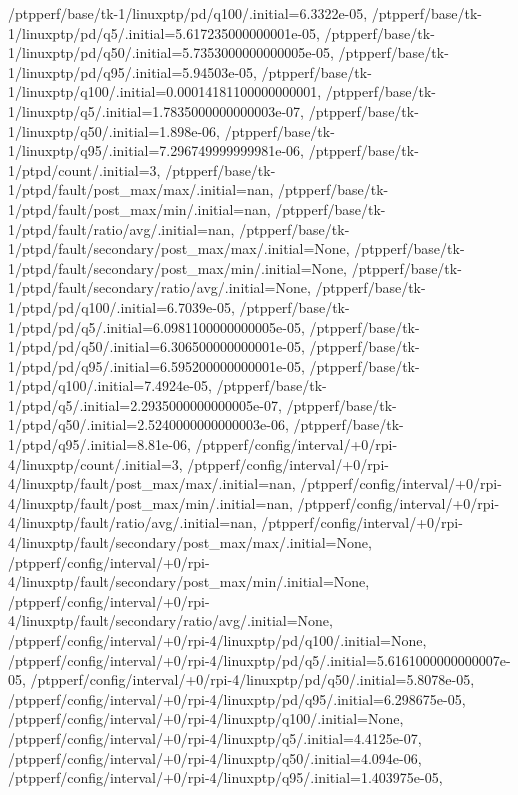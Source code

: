 {    /ptpperf/base/tk-1/linuxptp/pd/q100/.initial=6.3322e-05,
    /ptpperf/base/tk-1/linuxptp/pd/q5/.initial=5.617235000000001e-05,
    /ptpperf/base/tk-1/linuxptp/pd/q50/.initial=5.7353000000000005e-05,
    /ptpperf/base/tk-1/linuxptp/pd/q95/.initial=5.94503e-05,
    /ptpperf/base/tk-1/linuxptp/q100/.initial=0.00014181100000000001,
    /ptpperf/base/tk-1/linuxptp/q5/.initial=1.7835000000000003e-07,
    /ptpperf/base/tk-1/linuxptp/q50/.initial=1.898e-06,
    /ptpperf/base/tk-1/linuxptp/q95/.initial=7.296749999999981e-06,
    /ptpperf/base/tk-1/ptpd/count/.initial=3,
    /ptpperf/base/tk-1/ptpd/fault/post_max/max/.initial=nan,
    /ptpperf/base/tk-1/ptpd/fault/post_max/min/.initial=nan,
    /ptpperf/base/tk-1/ptpd/fault/ratio/avg/.initial=nan,
    /ptpperf/base/tk-1/ptpd/fault/secondary/post_max/max/.initial=None,
    /ptpperf/base/tk-1/ptpd/fault/secondary/post_max/min/.initial=None,
    /ptpperf/base/tk-1/ptpd/fault/secondary/ratio/avg/.initial=None,
    /ptpperf/base/tk-1/ptpd/pd/q100/.initial=6.7039e-05,
    /ptpperf/base/tk-1/ptpd/pd/q5/.initial=6.0981100000000005e-05,
    /ptpperf/base/tk-1/ptpd/pd/q50/.initial=6.306500000000001e-05,
    /ptpperf/base/tk-1/ptpd/pd/q95/.initial=6.595200000000001e-05,
    /ptpperf/base/tk-1/ptpd/q100/.initial=7.4924e-05,
    /ptpperf/base/tk-1/ptpd/q5/.initial=2.2935000000000005e-07,
    /ptpperf/base/tk-1/ptpd/q50/.initial=2.5240000000000003e-06,
    /ptpperf/base/tk-1/ptpd/q95/.initial=8.81e-06,
    /ptpperf/config/interval/+0/rpi-4/linuxptp/count/.initial=3,
    /ptpperf/config/interval/+0/rpi-4/linuxptp/fault/post_max/max/.initial=nan,
    /ptpperf/config/interval/+0/rpi-4/linuxptp/fault/post_max/min/.initial=nan,
    /ptpperf/config/interval/+0/rpi-4/linuxptp/fault/ratio/avg/.initial=nan,
    /ptpperf/config/interval/+0/rpi-4/linuxptp/fault/secondary/post_max/max/.initial=None,
    /ptpperf/config/interval/+0/rpi-4/linuxptp/fault/secondary/post_max/min/.initial=None,
    /ptpperf/config/interval/+0/rpi-4/linuxptp/fault/secondary/ratio/avg/.initial=None,
    /ptpperf/config/interval/+0/rpi-4/linuxptp/pd/q100/.initial=None,
    /ptpperf/config/interval/+0/rpi-4/linuxptp/pd/q5/.initial=5.6161000000000007e-05,
    /ptpperf/config/interval/+0/rpi-4/linuxptp/pd/q50/.initial=5.8078e-05,
    /ptpperf/config/interval/+0/rpi-4/linuxptp/pd/q95/.initial=6.298675e-05,
    /ptpperf/config/interval/+0/rpi-4/linuxptp/q100/.initial=None,
    /ptpperf/config/interval/+0/rpi-4/linuxptp/q5/.initial=4.4125e-07,
    /ptpperf/config/interval/+0/rpi-4/linuxptp/q50/.initial=4.094e-06,
    /ptpperf/config/interval/+0/rpi-4/linuxptp/q95/.initial=1.403975e-05,
}
